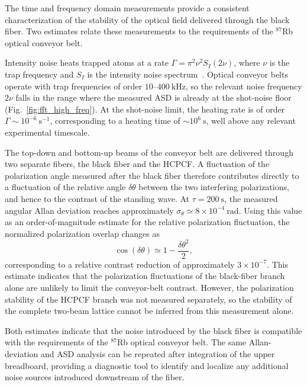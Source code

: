 The time and frequency domain measurements provide a consistent
characterization of the stability of the optical field delivered through
the black fiber. Two estimates relate these measurements
to the requirements of the $^{87}$Rb optical conveyor belt.

Intensity noise heats trapped atoms at a rate
$\Gamma = \pi^2\nu^2 S_I(2\nu)$, where $\nu$ is the trap frequency and
$S_I$ is the intensity noise spectrum~\cite{Savard:97,Gehm:98}. Optical
conveyor belts operate with trap frequencies of order
$10$--$400~\mathrm{kHz}$, so the relevant noise frequency $2\nu$ falls in
the range where the measured ASD is already at the shot-noise floor
(Fig.~\ref{fig:fft_high_freq}). At the shot-noise limit, the heating rate
is of order $\Gamma \sim 10^{-6}~\mathrm{s}^{-1}$, corresponding to a
heating time of $\sim10^{6}~\mathrm{s}$, well above any relevant
experimental timescale.

The top-down and bottom-up beams of the conveyor belt are delivered
through two separate fibers, the black fiber and the HCPCF. A fluctuation of the polarization angle
measured after the black fiber therefore contributes directly to a
fluctuation of the relative angle $\delta\theta$ between the two
interfering polarizations, and hence to the contrast of the standing
wave.
At $\tau = 200~\mathrm{s}$, the measured angular Allan deviation
reaches approximately $\sigma_\theta \simeq 8\times10^{-4}~\mathrm{rad}$.
Using this value as an order-of-magnitude estimate for the relative
polarization fluctuation, the normalized polarization overlap changes as
\[
\cos(\delta\theta) \simeq 1-\frac{\delta\theta^2}{2},
\]
corresponding to a relative contrast reduction of approximately
$3\times10^{-7}$. This estimate indicates that the polarization fluctuations
of the black-fiber branch alone are unlikely to limit the conveyor-belt
contrast. However, the polarization stability of the HCPCF branch was not
measured separately, so the stability of the complete two-beam lattice
cannot be inferred from this measurement alone.


Both estimates indicate that the noise introduced by the black fiber is
compatible with the requirements of the $^{87}$Rb optical conveyor belt.
The same Allan-deviation and ASD analysis can be repeated after
integration of the upper breadboard, providing a diagnostic tool to
identify and localize any additional noise sources introduced downstream
of the fiber.
